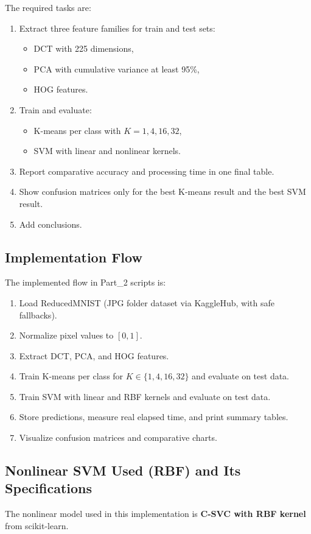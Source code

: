 \documentclass[12pt, a4paper]{article}
\begin{document}
The required tasks are:
\begin{enumerate}
    \item Extract three feature families for train and test sets:
    \begin{itemize}
        \item DCT with 225 dimensions,
        \item PCA with cumulative variance at least 95\%,
        \item HOG features.
    \end{itemize}
    \item Train and evaluate:
    \begin{itemize}
        \item K-means per class with \(K = 1, 4, 16, 32\),
        \item SVM with linear and nonlinear kernels.
    \end{itemize}
    \item Report comparative accuracy and processing time in one final table.
    \item Show confusion matrices only for the best K-means result and the best SVM result.
    \item Add conclusions.
\end{enumerate}

\subsection{Implementation Flow}
The implemented flow in Part\_2 scripts is:
\begin{enumerate}
    \item Load ReducedMNIST (JPG folder dataset via KaggleHub, with safe fallbacks).
    \item Normalize pixel values to \([0,1]\).
    \item Extract DCT, PCA, and HOG features.
    \item Train K-means per class for \(K \in \{1,4,16,32\}\) and evaluate on test data.
    \item Train SVM with linear and RBF kernels and evaluate on test data.
    \item Store predictions, measure real elapsed time, and print summary tables.
    \item Visualize confusion matrices and comparative charts.
\end{enumerate}

\subsection{Nonlinear SVM Used (RBF) and Its Specifications}
The nonlinear model used in this implementation is \textbf{C-SVC with RBF kernel} from scikit-learn.
\end{document}
